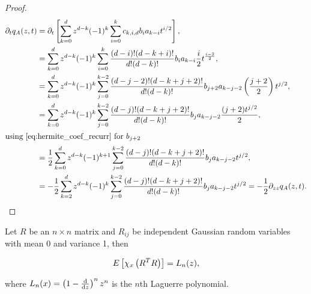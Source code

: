 \begin{proof}
        \begin{align*}
            \partial_t q_A(z,t) &= \partial_t \left[ \sum_{k=0}^d z^{d-k}(-1)^k \sum_{i=0}^k c_{k,i,d} b_i a_{k-i} t^{i/2} \right],\\ 
            &= \sum_{k=0}^d z^{d-k}(-1)^k \sum_{i=0}^k \frac{(d-i)!(d-k+i)!}{d!(d-k)!} b_i a_{k-i} \frac{i}{2}t^{\frac{i-2}{2}},\\ 
            &= \sum_{k=0}^d z^{d-k}(-1)^k \sum_{j=0}^{k-2} \frac{(d-j-2)!(d-k+j+2)!}{d!(d-k)!} b_{j+2}a_{k-j-2}\left( \frac{j+2}{2} \right)t^{j/2},\\ 
            &= \sum_{k=0}^d z^{d-k}(-1)^k \sum_{j=0}^{k-2} \frac{(d-j)!(d-k+j+2)!}{d!(d-k)!} b_ja_{k-j-2}\frac{(j+2)t^{j/2}}2,\\
            \intertext{using \eqref{eq:hermite_coef_recurr} for $b_{j+2}$} 
            &= \frac12 \sum_{k=0}^d z^{d-k}(-1)^{k+1} \sum_{j=0}^{k-2} \frac{(d-j)!(d-k+j+2)!}{d!(d-k)!} b_ja_{k-j-2}t^{j/2}, \\ 
            &= -\frac12 \sum_{k=2}^d z^{d-k}(-1)^{k} \sum_{j=0}^{k-2} \frac{(d-j)!(d-k+j+2)!}{d!(d-k)!} b_ja_{k-j-2}t^{j/2} = -\frac12 \partial_{zz} q_A(z,t).
        \end{align*}





    \end{proof}
    







\begin{theorem}
    Let $R$ be an $n\times n$ matrix and $R_{ij}$ be independent Gaussian random variables with mean 0 and variance 1, then

    \begin{equation*}
        E\left[ \chi_x\left(R^TR\right) \right] = L_n(z),
    \end{equation*}

    \noindent where $L_n(x) = \left( 1 - \frac{\mathrm d}{\mathrm d z} \right)^n z^n$ is the $n$th Laguerre polynomial.
\end{theorem}

